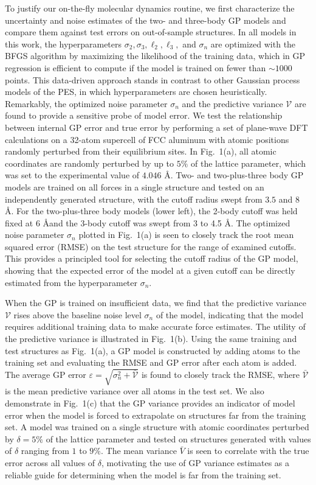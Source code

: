 \documentclass[%
reprint,
superscriptaddress,
amsmath,amssymb,
aps,
prl,
]{revtex4-1}
\begin{document}
To justify our on-the-fly molecular dynamics routine, we first characterize the uncertainty and noise estimates of the two- and three-body GP models and compare them against test errors on out-of-sample structures. In all models in this work, the hyperparameters $\sigma_2, \sigma_3, \ell_2, \ell_3,$ and $\sigma_n$ are optimized with the BFGS algorithm by maximizing the likelihood of the training data, which in GP regression is efficient to compute if the model is trained on fewer than $\sim 1000$ points. This data-driven approach stands in contrast to other Gaussian process models of the PES, in which hyperparameters are chosen heuristically. Remarkably, the optimized noise parameter $\sigma_n$ and the predictive variance $\mathcal{V}$ are found to provide a sensitive probe of model error. We test the relationship between internal GP error and true error by performing a set of plane-wave DFT calculations on a 32-atom supercell of FCC aluminum with atomic positions randomly perturbed from their equilibrium sites. In Fig.\ 1(a), all atomic coordinates are randomly perturbed by up to $5\%$ of the lattice parameter, which was set to the experimental value of $4.046$ \AA. Two- and two-plus-three body GP models are trained on all forces in a single structure and tested on an independently generated structure, with the cutoff radius swept from $3.5$ and $8$ \AA. For the two-plus-three body models (lower left), the 2-body cutoff was held fixed at $6$ \AA and the 3-body cutoff was swept from 3 to 4.5 \AA. The optimized noise parameter $\sigma_n$ plotted in Fig.\ 1(a) is seen to closely track the root mean squared error (RMSE) on the test structure for the range of examined cutoffs. This provides a principled tool for selecting the cutoff radius of the GP model, showing that the expected error of the model at a given cutoff can be directly estimated from the hyperparameter $\sigma_n$.

When the GP is trained on insufficient data, we find that the predictive variance $\mathcal{V}$ rises above the baseline noise level $\sigma_n$ of the model, indicating that the model requires additional training data to make accurate force estimates. The utility of the predictive variance is illustrated in Fig.\ 1(b). Using the same training and test structures as Fig.\ 1(a), a GP model is constructed by adding atoms to the training set and evaluating the RMSE and GP error after each atom is added. The average GP error $\varepsilon = \sqrt{\sigma_n^2 + \bar{\mathcal{V}}}$ is found to closely track the RMSE, where $\bar{\mathcal{V}}$ is the mean predictive variance over all atoms in the test set. We also demonstrate in Fig.\ 1(c) that the GP variance provides an indicator of model error when the model is forced to extrapolate on structures far from the training set. A model was trained on a single structure with atomic coordinates perturbed by $\delta = 5\%$ of the lattice parameter and tested on structures generated with values of $\delta$ ranging from $1$ to $9\%$. The mean variance $\bar{V}$ is seen to correlate with the true error across all values of $\delta$, motivating the use of GP variance estimates as a reliable guide for determining when the model is far from the training set.
\end{document}
